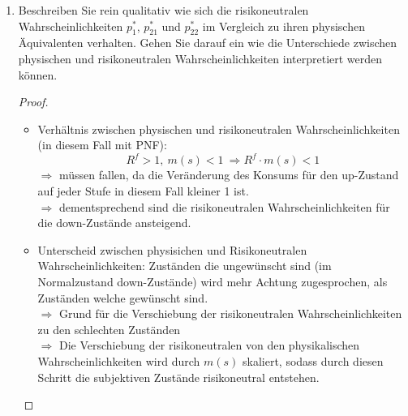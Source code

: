 \documentclass[12pt]{extreport} %
\theoremstyle{named}
\theoremstyle{nnamed}
\theoremstyle{itshape}
\theoremstyle{normal}
\begin{document}
\begin{enumerate}
\begin{proof}
			Unterschied zur Standardsituation
			\begin{enumerate}
				\item Hierbei handelt es sich um Konsum und nicht um monetäre Auszahlungen auf Grundlage eines dahinter liegenden Basiswerts
				\item Es handelt sich um ein zweistufiges Modell und nicht um ein einperiodiges Modell
			\end{enumerate}
			Diese Art der Separation ist möglich, da es sich um risikoneutrale Wahrscheinlichkeiten handelt, sodass die Risikoeinstellung in der Berechnung wegfällt.
		\end{proof}
	\item Beschreiben Sie rein qualitativ wie sich die risikoneutralen Wahrscheinlichkeiten $p_1^*$, $p_{21}^*$ und $p_{22}^*$ im Vergleich zu ihren physischen Äquivalenten verhalten. Gehen Sie darauf ein wie die Unterschiede zwischen physischen und risikoneutralen Wahrscheinlichkeiten interpretiert werden können.
		\begin{proof} ~\
			\begin{itemize}
				\item Verhältnis zwischen physischen und risikoneutralen Wahrscheinlichkeiten (in diesem Fall mit PNF):
						$$ R^f > 1, ~ m(s) < 1 ~ \Rightarrow R^f \cdot m(s) < 1 $$
						$\Rightarrow$ müssen fallen, da die Veränderung des Konsums für den up-Zustand auf jeder Stufe in diesem Fall kleiner 1 ist. ~\\
						$\Rightarrow$ dementsprechend sind die risikoneutralen Wahrscheinlichkeiten für die down-Zustände ansteigend.
				\item Unterscheid zwischen physisichen und Risikoneutralen Wahrscheinlichkeiten: Zuständen die ungewünscht sind (im Normalzustand down-Zustände) wird mehr Achtung zugesprochen, als Zuständen welche gewünscht sind. ~\\
				$\Rightarrow$ Grund für die Verschiebung der risikoneutralen Wahrscheinlichkeiten zu den schlechten Zuständen ~\\
				$\Rightarrow$ Die Verschiebung der risikoneutralen von den physikalischen Wahrscheinlichkeiten wird durch $m(s)$ skaliert, sodass durch diesen Schritt die subjektiven Zustände risikoneutral entstehen.
			\end{itemize}
		\end{proof}
\end{enumerate}
\end{document}
